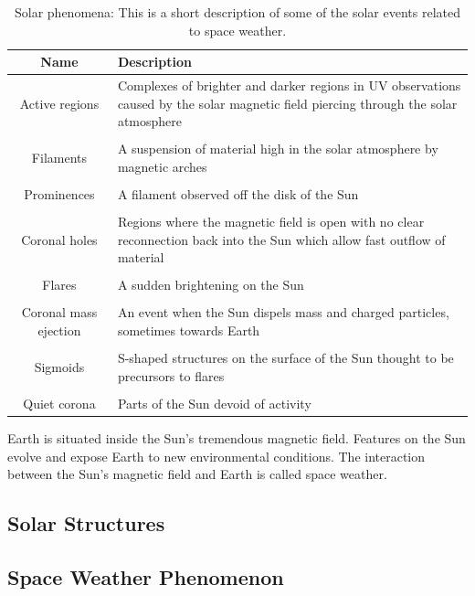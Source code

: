\documentclass[twoside]{report}
\begin{document}
\begin{table}[ht!]
\centering
 \begin{tabular}{||c m{}||} 
 \hline
 Name & Description \\
   \hline\hline
   Active regions & Complexes of brighter and darker regions in UV observations caused by the solar magnetic field piercing through the solar atmosphere \\ \hline \\
   Filaments & A suspension of material high in the solar atmosphere by magnetic arches\\ \hline \\
   Prominences & A filament observed off the disk of the Sun \\ \hline \\
   Coronal holes & Regions where the magnetic field is open with no clear reconnection back into the Sun which allow fast outflow of material \\ \hline \\
   Flares & A sudden brightening on the Sun \\ \hline \\
   Coronal mass ejection & An event when the Sun dispels mass and charged particles, sometimes towards Earth \\ \hline \\
   Sigmoids & S-shaped structures on the surface of the Sun thought to be precursors to flares \\ \hline \\
   Quiet corona & Parts of the Sun devoid of activity \\ 
 \hline
 \end{tabular}
 \caption{Solar phenomena: This is a short description of some of the solar events related to space weather. }
 \label{tab:solarfeatures}
\end{table}


Earth is situated inside the Sun's tremendous magnetic field. Features on the Sun evolve and expose Earth to new environmental conditions. The interaction between the Sun's magnetic field and Earth is called space weather.

\subsection{Solar Structures}

\subsection{Space Weather Phenomenon} \label{sec:space-weather-events}
\end{document}
